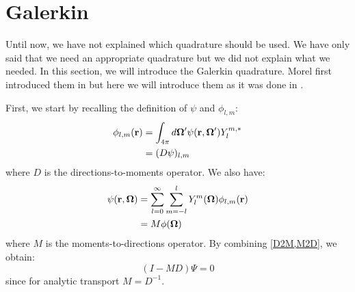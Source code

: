 \section{Galerkin}
Until now, we have not explained which quadrature should be used. We have only
said that we need an appropriate quadrature but we did not explain what we
needed. In this section, we will introduce the Galerkin quadrature. Morel
first introduced them in \cite{galerkin_morel} but here we
will introduce them as it was done in \cite{pautz_fp}. 

First, we start by recalling the definition of $\psi$ and $\phi_{l,m}$:
\begin{equation}
\begin{split}
\phi_{l,m}(\br) &= \int_{4\pi} d\bo' \psi(\br,\bo') Y_l^{m,*}\\
&=(D \psi)_{l,m}
\end{split}
\label{D2M}
\end{equation}
where $D$ is the directions-to-moments operator. We also have:
\begin{equation}
\begin{split}
\psi(\br,\bo) &= \sum_{l=0}^{\infty} \sum_{m=-l}^l Y_l^m(\bo)\phi_{l,m}(\br)\\
&= M\phi(\bo)
\end{split}
\label{M2D}
\end{equation}
where $M$ is the moments-to-directions operator. By combining \cref{D2M,M2D}, 
we obtain:
\begin{equation}
(I-MD)\Psi = 0
\label{identity_alpha}
\end{equation}
since for analytic transport $M=D^{-1}$.

